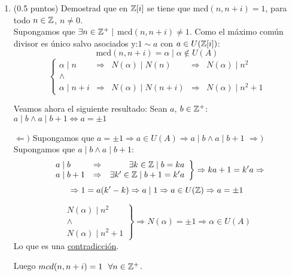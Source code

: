 \documentclass[12pt]{article}
\newcounter{ejercicio}[section] %
\newcounter{ejercicio}
\begin{document}
\begin{ejercicio}[4 puntos]
\begin{enumerate}
            \item (0.5 puntos) Demostrad que en $\mathbb{Z}[i]$ se tiene que mcd$(n,n+i) = 1$, para todo $n \in \mathbb{Z}$, $n \neq 0$.\\

                \noindent
                Supongamos que $\exists n \in \mathbb{Z}^{+} \mid$ mcd$(n, n+i) \neq 1$.\newline
                Como el máximo común divisor es único salvo asociados y:\newline $1\sim a$ con $a \in U(\mathbb{Z}[i])$:
                $$\mbox{mcd}(n, n+i) = \alpha \mid \alpha \notin U(A)$$
                $$\left\{ \begin{array}{lclcl}
                    \alpha \mid n & \Rightarrow & N(\alpha) \mid N(n) & \Rightarrow & N(\alpha) \mid n^2 \\
                    \land & & & & \\
                    \alpha \mid n+i & \Rightarrow & N(\alpha) \mid N(n+i) & \Rightarrow & N(\alpha) \mid n^2 +1
                \end{array}\right.$$

                Veamos ahora el siguiente resultado:\newline
                Sean $a$, $b \in \mathbb{Z}^{+}$: $a \mid b \land a\mid b+1 \Leftrightarrow a = \pm 1$

                \noindent
                $\Leftarrow)$ Supongamos que $a = \pm 1 \Rightarrow a \in U(A) \Rightarrow a \mid b \land a \mid b+1$\newline
                $\Rightarrow)$ Supongamos que $a \mid b \land a \mid b + 1$:
                $$\left. \begin{array}{lcr}
                    a \mid b & \Rightarrow & \exists k \in \mathbb{Z} \mid b = ka \\
                    a \mid b +1 & \Rightarrow & \exists k' \in \mathbb{Z} \mid b+1 = k'a
                \end{array}\right\} \Rightarrow ka+1 = k'a \Rightarrow$$
                $$\Rightarrow 1 = a(k'-k) \Rightarrow a \mid 1 \Rightarrow a \in U(\mathbb{Z}) \Rightarrow a = \pm 1$$

                $$\left. \begin{array}{l}
                    N(\alpha) \mid n^2 \\
                    \land \\
                    N(\alpha) \mid n^2 + 1
                \end{array}\right\} \Rightarrow N(\alpha) = \pm 1 \Rightarrow \alpha \in U(A)$$
                Lo que es una \underline{contradicción}.

                \noindent
                Luego $mcd(n, n+i) = 1~~\forall n \in \mathbb{Z}^{+}$.
        \end{enumerate} 
    \end{ejercicio}
    
\end{document}
